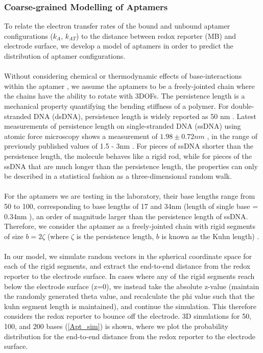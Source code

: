 \subsubsection{Coarse-grained Modelling of Aptamers}
To relate the electron transfer rates of the bound and unbound aptamer configurations ($k_{A}$, $k_{AT}$) to the distance between redox reporter (MB) and electrode surface, we develop a model of aptamers in order to predict the distribution of aptamer configurations.\\\\ 
Without considering chemical or thermodynamic effects of base-interactions within the aptamer \cite{feigon1996aptamer}, we assume the aptamers to be a freely-jointed chain where the chains have the ability to rotate with 3DOFs.
The persistence length is a mechanical property quantifying the bending stiffness of a polymer. For double-stranded DNA (dsDNA), persistence length is widely reported as 50 nm \cite{bloomfielduniversity,marko1995stretching}. Latest measurements of persistence length on single-stranded DNA (ssDNA) using atomic force microscopy shows a measurement of $1.98 \pm 0.72nm$ \cite{roth2018measuring}, in the range of previously published values of 1.5 - 3nm \cite{murphy2004probing,chi2013persistence}. For pieces of ssDNA shorter than the persistence length, the molecule behaves like a rigid rod, while for pieces of the ssDNA that are much longer than the persistence length, the properties can only be described in a statistical fashion as a three-dimensional random walk.\\\\
For the aptamers we are testing in the laboratory, their base lengths range from 50 to 100, corresponding to base lengths of 17 and 34nm (length of single base = 0.34nm \cite{alberts2014molecular}), an order of magnitude larger than the persistence length of ssDNA. Therefore, we consider the aptamer as a freely-jointed chain with rigid segments of size $b = 2\zeta$ (where $\zeta$ is the persistence length, $b$ is known as the Kuhn length) \cite{strobl1997physics}.\\\\
In our model, we simulate random vectors in the spherical coordinate space for each of the rigid segments, and extract the end-to-end distance from the redox reporter to the electrode surface. In cases where any of the rigid segments reach below the electrode surface (z=0), we instead take the absolute z-value (maintain the randomly generated theta value, and recalculate the phi value such that the kuhn segment length is maintained), and continue the simulation. This therefore considers the redox reporter to bounce off the electrode. 3D simulations for 50, 100, and 200 bases (\autoref{Apt_sim}) is shown, where we plot the probability distribution for the end-to-end distance from the redox reporter to the electrode surface. \\\\
